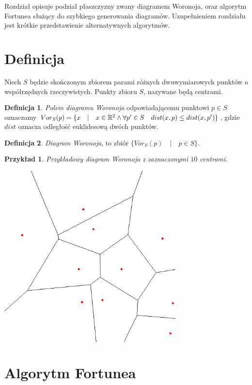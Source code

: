 \documentclass[declaration,shortabstract, inz]{iithesis}
\theoremstyle{definition} \newtheorem{definition}{Definicja}[]
\theoremstyle{plain} \newtheorem{remark}[definition]{Obserwacja}
\theoremstyle{plain} \newtheorem{theorem}[definition]{Twierdzenie}
\theoremstyle{plain} \newtheorem{example}{Przykład}[definition]
\theoremstyle{plain} \newtheorem{lemma}[definition]{Lemat}
\begin{document}
Rozdział opisuje podział płaszczyzny zwany diagramem Woronoja, oraz algorytm Fortunea służący do szybkiego generowania diagramów. Uzupełnieniem rozdziału jest krótkie przedstawienie alternatywnych algorytmów.
\section{Definicja}
Niech $S$ będzie skończonym zbiorem parami różnych dwuwymiarowych punktów o współrzędnych rzeczywistych. Punkty zbioru $S$, nazywane będą centrami.

\begin{definition}
	   \textit{Polem diagramu Woronoja} odpowiadającemu punktowi $p \in S$ oznaczamy $Vor_S(p) = \{ x \quad | \quad x 		\in \mathbb{R}^2 \land \forall p' \in S \quad \space dist(x, p) \leq dist(x, p')\}$, gdzie $dist$ oznacza odległość euklidesową dwóch punktów.
\end{definition}

\begin{definition}
	   \textit{Diagram Woronoja}, to zbiór $\{ Vor_S(p) \quad  | \quad p \in S\}$.
\end{definition}

\begin{example}
Przykładowy diagram Woronoja z zaznaczonymi $10$ centrami.
	\begin{center}
		\includegraphics[width=0.7\textwidth]{ExampleDiagram}
	\end{center}
\end{example}

\section{Algorytm Fortunea}
\label{sec:fortune}
\end{document}
